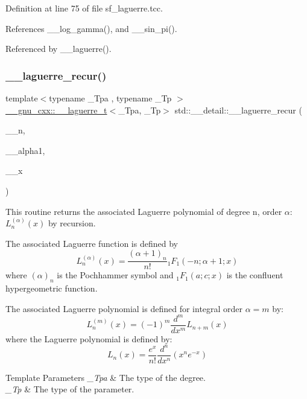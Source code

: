 Definition at line 75 of file sf\+\_\+laguerre.\+tcc.



References \+\_\+\+\_\+log\+\_\+gamma(), and \+\_\+\+\_\+sin\+\_\+pi().



Referenced by \+\_\+\+\_\+laguerre().

\mbox{\label{namespacestd_1_1____detail_ab5344b00cf4ed8b39c9132ce0b9287af}} 
\subsubsection{\texorpdfstring{\+\_\+\+\_\+laguerre\+\_\+recur()}{\_\_laguerre\_recur()}}
{\footnotesize\ttfamily template$<$typename \+\_\+\+Tpa , typename \+\_\+\+Tp $>$ \\
\hyperlink{struct____gnu__cxx_1_1____laguerre__t}{\+\_\+\+\_\+gnu\+\_\+cxx\+::\+\_\+\+\_\+laguerre\+\_\+t}$<$\+\_\+\+Tpa, \+\_\+\+Tp$>$ std\+::\+\_\+\+\_\+detail\+::\+\_\+\+\_\+laguerre\+\_\+recur (\begin{DoxyParamCaption}\item[{unsigned int}]{\+\_\+\+\_\+n,  }\item[{\+\_\+\+Tpa}]{\+\_\+\+\_\+alpha1,  }\item[{\+\_\+\+Tp}]{\+\_\+\+\_\+x }\end{DoxyParamCaption})}



This routine returns the associated Laguerre polynomial of degree {\ttfamily n}, order {\ttfamily $ \alpha $}\+: $ L_n^{(\alpha)}(x) $ by recursion. 

The associated Laguerre function is defined by \[ L_n^{(\alpha)}(x) = \frac{(\alpha + 1)_n}{n!} {}_1F_1(-n; \alpha + 1; x) \] where $ (\alpha)_n $ is the Pochhammer symbol and $ {}_1F_1(a; c; x) $ is the confluent hypergeometric function.

The associated Laguerre polynomial is defined for integral order $ \alpha = m $ by\+: \[ L_n^{(m)}(x) = (-1)^m \frac{d^m}{dx^m} L_{n + m}(x) \] where the Laguerre polynomial is defined by\+: \[ L_n(x) = \frac{e^x}{n!} \frac{d^n}{dx^n} (x^ne^{-x}) \]


\begin{DoxyTemplParams}{Template Parameters}
{\em \+\_\+\+Tpa} & The type of the degree. \\
\hline
{\em \+\_\+\+Tp} & The type of the parameter. \\
\hline
\end{DoxyTemplParams}

